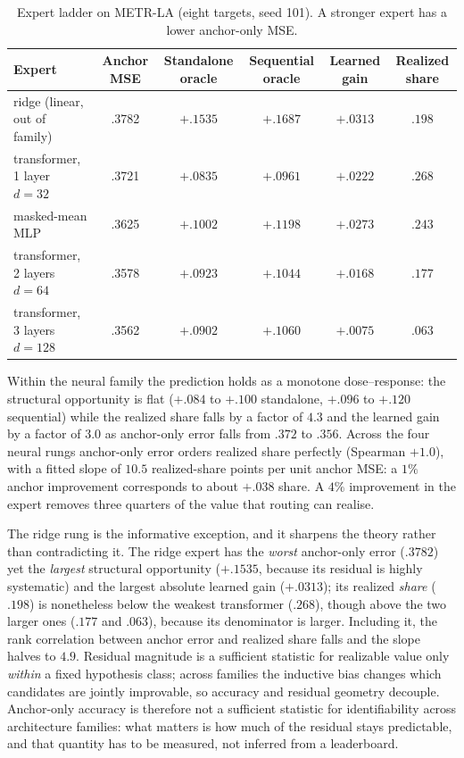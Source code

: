 \begin{table}[t]
 \centering
 \small
 \caption{Expert ladder on METR-LA (eight targets, seed 101). A stronger expert
 has a lower anchor-only MSE.}
 \label{tab:ladder}
 \begin{tabular}{lccccc}
  \toprule
  Expert & Anchor MSE & Standalone oracle & Sequential oracle & Learned gain & Realized share\\
  \midrule
  ridge (linear, out of family) & .3782 & $+.1535$ & $+.1687$ & $+.0313$ & $.198$\\
  transformer, 1 layer $d{=}32$ & .3721 & $+.0835$ & $+.0961$ & $+.0222$ & $.268$\\
  masked-mean MLP & .3625 & $+.1002$ & $+.1198$ & $+.0273$ & $.243$\\
  transformer, 2 layers $d{=}64$ & .3578 & $+.0923$ & $+.1044$ & $+.0168$ & $.177$\\
  transformer, 3 layers $d{=}128$ & .3562 & $+.0902$ & $+.1060$ & $+.0075$ & $.063$\\
  \bottomrule \end{tabular}
\end{table}

Within the neural family the prediction holds as a monotone dose--response: the
structural opportunity is flat ($+.084$ to $+.100$ standalone, $+.096$ to
$+.120$ sequential) while the realized share falls by a factor of $4.3$ and the
learned gain by a factor of $3.0$ as anchor-only error falls from $.372$ to
$.356$. Across the four neural rungs anchor-only error orders realized share
perfectly (Spearman $+1.0$), with a fitted slope of $10.5$ realized-share points
per unit anchor MSE: a $1\%$ anchor improvement corresponds to about $+.038$
share. A $4\%$ improvement in the expert removes three quarters of the value
that routing can realise.

The ridge rung is the informative exception, and it sharpens the theory rather
than contradicting it. The ridge expert has the \emph{worst} anchor-only error
($.3782$) yet the \emph{largest} structural opportunity ($+.1535$, because its
residual is highly systematic) and the largest absolute learned gain
($+.0313$); its realized \emph{share} ($.198$) is nonetheless below the weakest
transformer ($.268$), though above the two larger ones ($.177$ and $.063$),
because its denominator is larger. Including it, the rank correlation between
anchor error and realized share falls and the slope halves to $4.9$. Residual
magnitude is a sufficient statistic for realizable value only \emph{within} a fixed
hypothesis class; across families the inductive bias changes which candidates
are jointly improvable, so accuracy and residual geometry decouple. Anchor-only
accuracy is therefore not a sufficient statistic for identifiability across
architecture families: what matters is how much of the residual stays
predictable, and that quantity has to be measured, not inferred from a
leaderboard.

